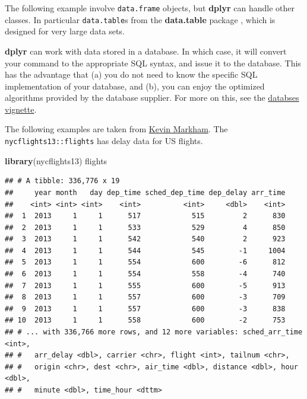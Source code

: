 \documentclass[]{book}
\newenvironment{Shaded}{\begin{snugshade}}{\end{snugshade}}
\newcommand{\KeywordTok}[1]{\textcolor[rgb]{0.13,0.29,0.53}{\textbf{#1}}}
\newcommand{\NormalTok}[1]{#1}
\theoremstyle{definition}
\theoremstyle{definition}
\theoremstyle{definition}
\theoremstyle{remark}
\begin{document}
The following example involve \texttt{data.frame} objects, but
\textbf{dplyr} can handle other classes. In particular
\texttt{data.table}s from the \textbf{data.table} package
\citep{datatable}, which is designed for very large data sets.

\textbf{dplyr} can work with data stored in a database. In which case,
it will convert your command to the appropriate SQL syntax, and issue it
to the database. This has the advantage that (a) you do not need to know
the specific SQL implementation of your database, and (b), you can enjoy
the optimized algorithms provided by the database supplier. For more on
this, see the
\href{https://cran.r-project.org/web/packages/dplyr/vignettes/databases.html}{databses
vignette}.

The following examples are taken from
\href{https://github.com/justmarkham/dplyr-tutorial/blob/master/dplyr-tutorial.Rmd}{Kevin
Markham}. The \texttt{nycflights13::flights} has delay data for US
flights.

\begin{Shaded}
\begin{Highlighting}[]
\KeywordTok{library}\NormalTok{(nycflights13)}
\NormalTok{flights}
\end{Highlighting}
\end{Shaded}

\begin{verbatim}
## # A tibble: 336,776 x 19
##     year month   day dep_time sched_dep_time dep_delay arr_time
##    <int> <int> <int>    <int>          <int>     <dbl>    <int>
##  1  2013     1     1      517            515         2      830
##  2  2013     1     1      533            529         4      850
##  3  2013     1     1      542            540         2      923
##  4  2013     1     1      544            545        -1     1004
##  5  2013     1     1      554            600        -6      812
##  6  2013     1     1      554            558        -4      740
##  7  2013     1     1      555            600        -5      913
##  8  2013     1     1      557            600        -3      709
##  9  2013     1     1      557            600        -3      838
## 10  2013     1     1      558            600        -2      753
## # ... with 336,766 more rows, and 12 more variables: sched_arr_time <int>,
## #   arr_delay <dbl>, carrier <chr>, flight <int>, tailnum <chr>,
## #   origin <chr>, dest <chr>, air_time <dbl>, distance <dbl>, hour <dbl>,
## #   minute <dbl>, time_hour <dttm>
\end{verbatim}
\end{document}
